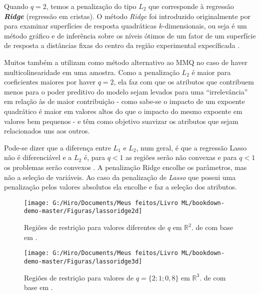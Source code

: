 \documentclass[
  openany]{book}
\begin{document}
Quando \(q=2\), temos a penalização do tipo \textbf{\(L_2\)} que corresponde à regressão \textbf{\emph{Ridge}} (regressão em cristas). O método \emph{Ridge} foi introduzido originalmente por \citet{hoerl1959optimum} para examinar superfícies de resposta quadráticas \(k\)-dimensionais, ou seja é um método gráfico e de inferência sobre os níveis ótimos de um fator de um superfície de resposta a distâncias fixas do centro da região experimental expecíficada \citep{do2009metodo}.

Muitos também a utilizam como método alternativo ao MMQ no caso de haver multicolinearidade em uma amostra. Como a penalização \(L_2\) é maior para coeficientes maiores por haver \(q=2\), ela faz com que os atributos que contribuem menos para o poder preditivo do modelo sejam levados para uma ``irrelevância'' em relação às de maior contribuição - como sabe-se o impacto de um expoente quadrático é maior em valores altos do que o impacto do mesmo expoente em valores bem pequenos - e têm como objetivo suavizar os atributos que sejam relacionados uns aos outros.

Pode-se dizer que a diferença entre \(L_1\) e \(L_2\), num geral, é que a regressão Lasso não é diferenciável e a \(L_2\) é, para \(q<1\) as regiões serão não convexas e para \(q<1\) os problemas serão convexos \citep{silva2018tecnica}. A penalização Ridge encolhe os parâmetros, mas não a seleção de variáveis. Ao caso da penalização de \emph{Lasso} que possui uma penalização pelos valores absolutos ela encolhe e faz a seleção dos atributos.

\begin{figure}

{\centering \texttt{[image: G:/Hiro/Documents/Meus feitos/Livro ML/bookdown-demo-master/Figuras/lassoridge2d]} 

}

\caption{Regiões de restrição para valores diferentes de \(q\) em \(\mathbb{R}^2\). de \citet{silva2018tecnica} com base em \citet{hastie2015statistical}.}\label{fig:lassoridge2d}
\end{figure}



\begin{figure}

{\centering \texttt{[image: G:/Hiro/Documents/Meus feitos/Livro ML/bookdown-demo-master/Figuras/lassoridge3d]} 

}

\caption{Regiões de restrição para valores de \(q=\{2;1;0,8\}\) em \(\mathbb{R}^3\). de \citet{silva2018tecnica} com base em \citet{hastie2015statistical}.}\label{fig:lassoridge3d}
\end{figure}
\end{document}
